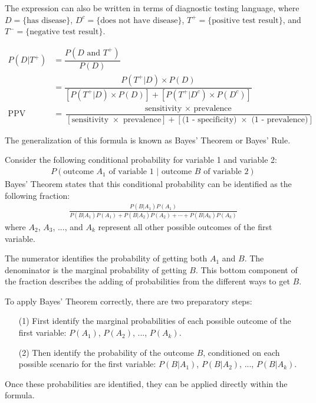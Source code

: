 The expression can also be written in terms of diagnostic testing language, where $D = \text{\{has disease\}}$, $D^c = \text{\{does not have disease\}}$, $T^{+} = \text{\{positive test result\}}$, and $T^{-} = \text{\{negative test result\}}$.

\begin{align*}
P(D|T^{+}) &= \dfrac{P(D \text{ and } T^{+})}{P(D)} \\
&= \dfrac{P(T^{+}|D) \times P(D)}{[P(T^{+}|D) \times P(D)] + [P(T^{+}|D^c) \times P(D^c)]} \\
\text{PPV} &= \dfrac{\text{sensitivity } \times \text{ prevalence}}{[\text{sensitivity } \times \text{ prevalence}] + [\text{(1 - specificity) } \times \text{ (1 - prevalence)}]}
\end{align*}

The generalization of this formula is known as Bayes' Theorem or Bayes' Rule.

\begin{termBox}{
Consider the following conditional probability for variable 1 and variable 2:\vspace{-1.5mm}
\begin{align*}
P(\text{outcome $A_1$ of variable 1 } | \text{ outcome $B$ of variable 2})
\end{align*}
Bayes' Theorem states that this conditional probability can be identified as the following fraction:\vspace{-1.5mm}
\begin{align}
\frac{P(B | A_1) P(A_1)}
	{P(B | A_1) P(A_1) + P(B | A_2) P(A_2) + \cdots + P(B | A_k) P(A_k)}
	\label{equationOfBayesTheorem}
\end{align}
where $A_2$, $A_3$, ..., and $A_k$ represent all other possible outcomes of the first variable.}
\end{termBox}

The numerator identifies the probability of getting both $A_1$ and $B$. The denominator is the marginal probability of getting $B$. This bottom component of the fraction describes the adding of probabilities from the different ways to get $B$. 

To apply Bayes' Theorem correctly, there are two preparatory steps:
\begin{enumerate}
\setlength{\itemsep}{0mm}
\item[(1)] First identify the marginal probabilities of each possible outcome of the first variable: $P(A_1)$, $P(A_2)$, ..., $P(A_k)$.
\item[(2)] Then identify the probability of the outcome $B$, conditioned on each possible scenario for the first variable: $P(B | A_1)$, $P(B | A_2)$, ..., $P(B | A_k)$.
\end{enumerate}
Once these probabilities are identified, they can be applied directly within the formula.

